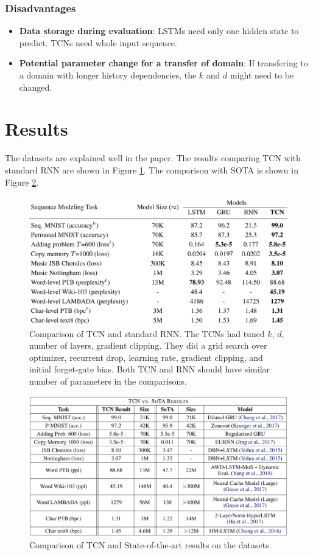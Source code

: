 \documentclass[12pt, titlepage]{article}
\begin{document}
\subsubsection{Disadvantages}

\begin{itemize}
\item \textbf{Data storage during evaluation}: LSTMs need only one hidden state to predict. TCNs need whole input sequence.
\item \textbf{Potential parameter change for a transfer of domain}: If transfering to a domain with longer history dependencies, the $k$ and $d$ might need to be changed.
\end{itemize}

\section{Results}

The datasets are explained well in the paper.
The results comparing TCN with standard RNN are shown in Figure \ref{fig:results}. The comparison with SOTA is shown in Figure \ref{fig:sota}.

\begin{figure}[h!]
\includegraphics[width=1.0\textwidth]{../img/results}
\caption{Comparison of TCN and standard RNN. The TCNs had tuned $k$, $d$, number of layers, gradient clipping. They did a grid search over optimizer, recurrent drop, learning rate, gradient clipping, and initial forget-gate bias. Both TCN and RNN should have similar number of parameters in the comparisons.}
\label{fig:results}
\end{figure}

\begin{figure}[h!]
\includegraphics[width=1.0\textwidth]{../img/sota}
\caption{Comparison of TCN and State-of-the-art results on the datasets.}
\label{fig:sota}
\end{figure}
\end{document}
